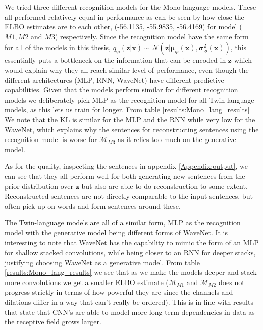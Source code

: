 We tried three different recognition models for the Mono-language models. These
all performed relatively equal in performance as can be seen by how close the
ELBO estimates are to each other, (-56.1135, -55.9835, -56.4169) for model
($M1, M2$ and $M3$) respectively. Since the recognition model have the same form
for all of the models in this thesis, $q_{\bm{\varphi}}(\bm{z} | \bm{x}) \sim
\mathcal{N}(\bm{z} | \bm{\mu}_{\bm{\varphi}}(\bm{x}),
\bm{\sigma}_{\bm{\varphi}}^2(\bm{x}))$, this essentially puts a bottleneck on the
information that can be encoded in $\bm{z}$ which would explain why they all
reach similar level of performance, even though the different architectures (MLP, RNN, WaveNet)
have different predictive capabilities. Given that the models perform similar
for different recognition models we deliberately pick MLP as the recognition
model for all Twin-language models, as this lets us train for longer. From table \ref{results:Mono_lang_results} We
note that the KL is similar for the MLP and the RNN while very low for the WaveNet, which explains why the sentences for
reconstructing sentences using the recognition model is worse for
$\mathcal{M}_{M3}$ as it relies too much on the generative model.

As for the quality, inspecting the sentences in appendix \ref{Appendix:output}, we can see that
they all perform well for both generating new sentences from the prior
distribution over $\bm{z}$ but also are able to do reconstruction to some
extent. Reconstructed sentences are not directly comparable to the input
sentences, but often pick up on words and form sentences around these.

The Twin-language models are all of a similar form, MLP as the recognition model
with the generative model being different forms of WaveNet. It is interesting to
note that WaveNet has the capability to mimic the form of an MLP for shallow
stacked convolutions, while being closer to an RNN for deeper stacks, justifying
choosing WaveNet as a generative model. From table
\ref{results:Mono_lang_results} we see that as we make the models deeper and
stack more convolutions we get a smaller ELBO estimate ($\mathcal{M}_{M1}$ and
$\mathcal{M}_{M2}$ does not progress strictly in terms of how powerful they are
since the channels and dilations differ in a way that can't really be ordered).
This is in line with results that state that CNN's are able to model more long
term dependencies in data as the receptive field grows larger.

